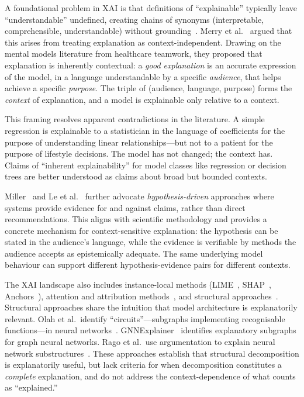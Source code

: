 \documentclass[11pt]{article}
\begin{document}
A foundational problem in XAI is that definitions of ``explainable'' typically leave ``understandable'' undefined, creating chains of synonyms (interpretable, comprehensible, understandable) without grounding~\cite{guidotti2018survey,doshi2017towards}. Merry et al.~\cite{merry2021mental} argued that this arises from treating explanation as context-independent. Drawing on the mental models literature from healthcare teamwork, they proposed that explanation is inherently contextual: a \emph{good explanation} is an accurate expression of the model, in a language understandable by a specific \emph{audience}, that helps achieve a specific \emph{purpose}. The triple of (audience, language, purpose) forms the \emph{context} of explanation, and a model is explainable only relative to a context.

This framing resolves apparent contradictions in the literature. A simple regression is explainable to a statistician in the language of coefficients for the purpose of understanding linear relationships---but not to a patient for the purpose of lifestyle decisions. The model has not changed; the context has. Claims of ``inherent explainability'' for model classes like regression or decision trees are better understood as claims about broad but bounded contexts.

Miller~\cite{miller2023evaluative} and Le et al.~\cite{le2024evaluative} further advocate \emph{hypothesis-driven} approaches where systems provide evidence for and against claims, rather than direct recommendations. This aligns with scientific methodology and provides a concrete mechanism for context-sensitive explanation: the hypothesis can be stated in the audience's language, while the evidence is verifiable by methods the audience accepts as epistemically adequate. The same underlying model behaviour can support different hypothesis-evidence pairs for different contexts.

The XAI landscape also includes instance-local methods (LIME~\cite{ribeiro2016why}, SHAP~\cite{lundberg2017unified}, Anchors~\cite{ribeiro2018anchors}), attention and attribution methods~\cite{vaswani2017attention,sundararajan2017axiomatic}, and structural approaches~\cite{rago2018argumentation,olah2020zoom,ying2019gnnexplainer}. Structural approaches share the intuition that model architecture is explanatorily relevant. Olah et al.\ identify ``circuits''---subgraphs implementing recognisable functions---in neural networks~\cite{olah2020zoom}. GNNExplainer~\cite{ying2019gnnexplainer} identifies explanatory subgraphs for graph neural networks. Rago et al.\ use argumentation to explain neural network substructures~\cite{rago2018argumentation}. These approaches establish that structural decomposition is explanatorily useful, but lack criteria for when decomposition constitutes a \emph{complete} explanation, and do not address the context-dependence of what counts as ``explained.''
\end{document}
